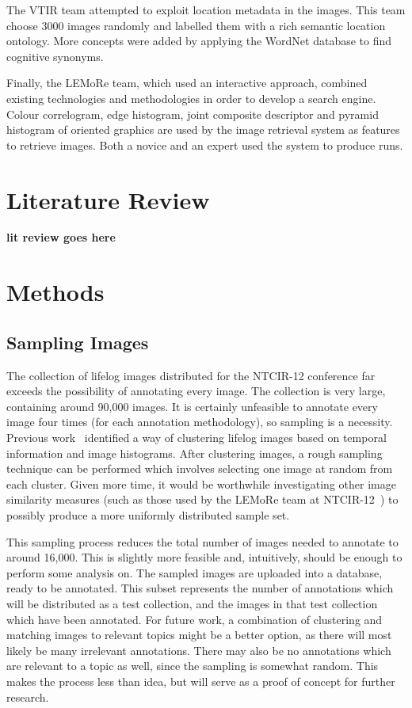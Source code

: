\documentclass[12pt,a4paper]{article}
\begin{document}
The VTIR team attempted to exploit location metadata in the images. This team choose 3000 images randomly and labelled them with a rich semantic location ontology. More concepts were added by applying the WordNet database to find cognitive synonyms.

Finally, the LEMoRe team, which used an interactive approach, combined existing technologies and methodologies in order to develop a search engine. Colour correlogram, edge histogram, joint composite descriptor and pyramid histogram of oriented graphics are used by the image retrieval system as features to retrieve images. Both a novice and an expert used the system to produce runs.
\section{Literature Review}

\textbf{lit review goes here}

\section{Methods}

\subsection{Sampling Images}

The collection of lifelog images distributed for the NTCIR-12 conference far exceeds the possibility of annotating every image. The collection is very large, containing around 90,000 images. It is certainly unfeasible to annotate every image four times (for each annotation methodology), so sampling is a necessity. Previous work~\citep{scells2016qut} identified a way of clustering lifelog images based on temporal information and image histograms. After clustering images, a rough sampling technique can be performed which involves selecting one image at random from each cluster. Given more time, it would be worthwhile investigating other image similarity measures (such as those used by the LEMoRe team at NTCIR-12~\citep{de40lemore}) to possibly produce a more uniformly distributed sample set.

This sampling process reduces the total number of images needed to annotate to around 16,000. This is slightly more feasible and, intuitively, should be enough to perform some analysis on. The sampled images are uploaded into a database, ready to be annotated. This subset represents the number of annotations which will be distributed as a test collection, and the images in that test collection which have been annotated. For future work, a combination of clustering and matching images to relevant topics might be a better option, as there will most likely be many irrelevant annotations. There may also be no annotations which are relevant to a topic as well, since the sampling is somewhat random. This makes the process less than idea, but will serve as a proof of concept for further research.
\end{document}
